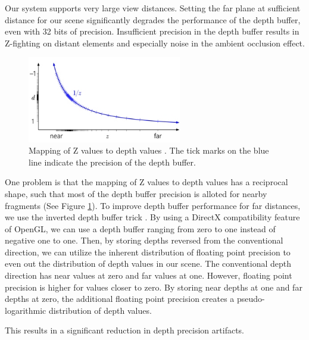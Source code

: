 Our system supports very large view distances.
Setting the far plane at sufficient distance for our scene significantly degrades the performance of the depth buffer, even with 32 bits of precision.
Insufficient precision in the depth buffer results in Z-fighting on distant elements and especially noise in the ambient occlusion effect.

\begin{figure}
	\centering
		\includegraphics[width=0.6\textwidth]{figures/nvidia_precision_1.jpg}
	\caption{Mapping of Z values to depth values \cite{nvidia_depth_precision}. The tick marks on the blue line indicate the precision of the depth buffer.}
	\label{fig:nvidia_precision_1}
\end{figure}

One problem is that the mapping of Z values to depth values has a reciprocal shape, such that most of the depth buffer precision is alloted for nearby fragments (See Figure \ref{fig:nvidia_precision_1}).
To improve depth buffer performance for far distances, we use the inverted depth buffer trick \cite{nvidia_depth_precision}.
By using a DirectX compatibility feature of OpenGL, we can use a depth buffer ranging from zero to one instead of negative one to one.
Then, by storing depths reversed from the conventional direction, we can utilize the inherent distribution of floating point precision to even out the distribution of depth values in our scene.
The conventional depth direction has near values at zero and far values at one.
However, floating point precision is higher for values closer to zero.
By storing near depths at one and far depths at zero, the additional floating point precision creates a pseudo-logarithmic distribution of depth values.

This results in a significant reduction in depth precision artifacts.
